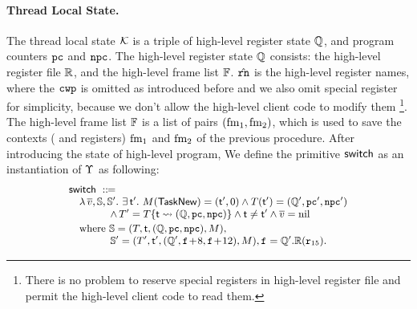 \paragraph{\textbf{Thread Local State.}} 
The thread local state $\mathcal{K}$ 
is a triple of high-level register state $\mathbb{Q}$, 
and program counters $\texttt{pc}$ and $\texttt{npc}$. The high-level 
register state $\mathbb{Q}$ consists: 
the high-level register file $\mathbb{R}$, 
and the high-level frame list $\mathbb{F}$. 
$\hat{\texttt{rn}}$ is the high-level register names, where 
the $\texttt{cwp}$ is omitted as introduced before and 
we also omit special register for simplicity, 
because we don't allow 
the high-level client code to modify them
\footnote{There is no problem to reserve special 
registers in high-level register file and permit
the high-level client code to read them.}. 
The high-level frame list $\mathbb{F}$ is a list of pairs 
$(\text{fm}_1, \text{fm}_2)$, which is used to save 
the contexts (\localRN{} and \inRN{} registers) 
$\text{fm}_1$ and $\text{fm}_2$ of the previous procedure. 
After introducing the state of high-level program, 
We define the primitive $\mathsf{switch}$ as 
an instantiation of $\Upsilon$ as following: 
\[
    \small
    \begin{array}{l}
        \primsw \ \define \\
        \quad 
        \lambda \, \args{\val}, \hpstate, \hpstate'. \ 
        \exists \, \thrdid'. \ 
        \Mem(\TaskNew) = (\thrdid', 0) \land 
        \thrdpool(\thrdid') = 
            (\hRstate', \pc', \npc') \\
        \qquad\qquad
        \land \,
        \thrdpool' = \thrdpool\{ \thrdid \rightsquigarrow 
            (\hRstate, \pc, \npc) \} 
            \land \tid \neq \tid' \land \args{\val} = \nil \\
        \\[-9pt]
        \quad \text{where} \ 
        \hpstate = 
            (\thrdpool, \thrdid, (\hRstate, \pc, \npc), \Mem), \\ 
        \qquad\qquad
        \hpstate' = 
            (\thrdpool', \thrdid', 
                (\hRstate', \lab{}\!+\!8, \lab{}\!+\!12), \Mem), 
                \lab{} = \hRstate'.\hRfile(\reg{15}). 
    \end{array}
\]
